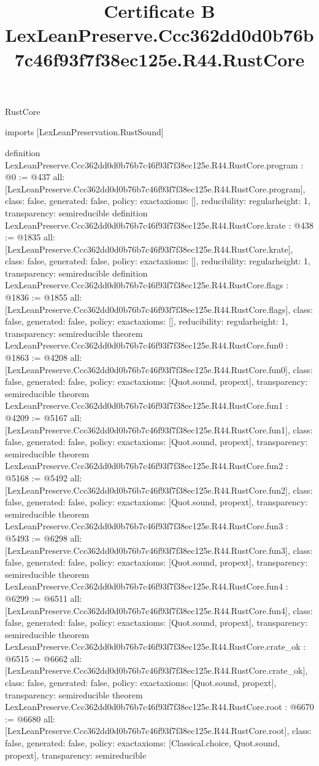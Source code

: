\begin{lexlean}{RustCore}
\title{Certificate B LexLeanPreserve.Ccc362dd0d0b76b7c46f93f7f38ec125e.R44.RustCore}
\begin{coremodule}
imports [LexLeanPreservation.RustSound]

definition LexLeanPreserve.Ccc362dd0d0b76b7c46f93f7f38ec125e.R44.RustCore.program : @0 := @437 {
  all: [LexLeanPreserve.Ccc362dd0d0b76b7c46f93f7f38ec125e.R44.RustCore.program],
  class: false,
  generated: false,
  policy: exact{axioms: []},
  reducibility: regular{height: 1},
  transparency: semireducible
}
definition LexLeanPreserve.Ccc362dd0d0b76b7c46f93f7f38ec125e.R44.RustCore.krate : @438 := @1835 {
  all: [LexLeanPreserve.Ccc362dd0d0b76b7c46f93f7f38ec125e.R44.RustCore.krate],
  class: false,
  generated: false,
  policy: exact{axioms: []},
  reducibility: regular{height: 1},
  transparency: semireducible
}
definition LexLeanPreserve.Ccc362dd0d0b76b7c46f93f7f38ec125e.R44.RustCore.flags : @1836 := @1855 {
  all: [LexLeanPreserve.Ccc362dd0d0b76b7c46f93f7f38ec125e.R44.RustCore.flags],
  class: false,
  generated: false,
  policy: exact{axioms: []},
  reducibility: regular{height: 1},
  transparency: semireducible
}
theorem LexLeanPreserve.Ccc362dd0d0b76b7c46f93f7f38ec125e.R44.RustCore.fun0 : @1863 := @4208 {
  all: [LexLeanPreserve.Ccc362dd0d0b76b7c46f93f7f38ec125e.R44.RustCore.fun0],
  class: false,
  generated: false,
  policy: exact{axioms: [Quot.sound, propext]},
  transparency: semireducible
}
theorem LexLeanPreserve.Ccc362dd0d0b76b7c46f93f7f38ec125e.R44.RustCore.fun1 : @4209 := @5167 {
  all: [LexLeanPreserve.Ccc362dd0d0b76b7c46f93f7f38ec125e.R44.RustCore.fun1],
  class: false,
  generated: false,
  policy: exact{axioms: [Quot.sound, propext]},
  transparency: semireducible
}
theorem LexLeanPreserve.Ccc362dd0d0b76b7c46f93f7f38ec125e.R44.RustCore.fun2 : @5168 := @5492 {
  all: [LexLeanPreserve.Ccc362dd0d0b76b7c46f93f7f38ec125e.R44.RustCore.fun2],
  class: false,
  generated: false,
  policy: exact{axioms: [Quot.sound, propext]},
  transparency: semireducible
}
theorem LexLeanPreserve.Ccc362dd0d0b76b7c46f93f7f38ec125e.R44.RustCore.fun3 : @5493 := @6298 {
  all: [LexLeanPreserve.Ccc362dd0d0b76b7c46f93f7f38ec125e.R44.RustCore.fun3],
  class: false,
  generated: false,
  policy: exact{axioms: [Quot.sound, propext]},
  transparency: semireducible
}
theorem LexLeanPreserve.Ccc362dd0d0b76b7c46f93f7f38ec125e.R44.RustCore.fun4 : @6299 := @6511 {
  all: [LexLeanPreserve.Ccc362dd0d0b76b7c46f93f7f38ec125e.R44.RustCore.fun4],
  class: false,
  generated: false,
  policy: exact{axioms: [Quot.sound, propext]},
  transparency: semireducible
}
theorem LexLeanPreserve.Ccc362dd0d0b76b7c46f93f7f38ec125e.R44.RustCore.crate_ok : @6515 := @6662 {
  all: [LexLeanPreserve.Ccc362dd0d0b76b7c46f93f7f38ec125e.R44.RustCore.crate_ok],
  class: false,
  generated: false,
  policy: exact{axioms: [Quot.sound, propext]},
  transparency: semireducible
}
theorem LexLeanPreserve.Ccc362dd0d0b76b7c46f93f7f38ec125e.R44.RustCore.root : @6670 := @6680 {
  all: [LexLeanPreserve.Ccc362dd0d0b76b7c46f93f7f38ec125e.R44.RustCore.root],
  class: false,
  generated: false,
  policy: exact{axioms: [Classical.choice, Quot.sound, propext]},
  transparency: semireducible
}


\end{coremodule}
\end{lexlean}
